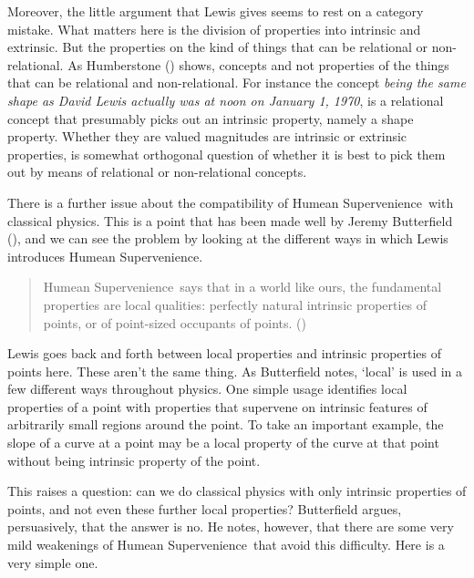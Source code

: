 \documentclass[
  11pt,
  letterpaper,
  DIV=11,
  numbers=noendperiod,
  twoside]{scrartcl}
\begin{document}
Moreover, the little argument that Lewis gives seems to rest on a
category mistake. What matters here is the division of properties into
intrinsic and extrinsic. But the properties on the kind of things that
can be relational or non-relational. As Humberstone
() shows, concepts and not
properties of the things that can be relational and non-relational. For
instance the concept \emph{being the same shape as David Lewis actually
was at noon on January 1, 1970}, is a relational concept that presumably
picks out an intrinsic property, namely a shape property. Whether they
are valued magnitudes are intrinsic or extrinsic properties, is somewhat
orthogonal question of whether it is best to pick them out by means of
relational or non-relational concepts.

There is a further issue about the compatibility of Humean
Supervenience~with classical physics. This is a point that has been made
well by Jeremy Butterfield (), and
we can see the problem by looking at the different ways in which Lewis
introduces Humean Supervenience.

\begin{quote}
Humean Supervenience~says that in a world like ours, the fundamental
properties are local qualities: perfectly natural intrinsic properties
of points, or of point-sized occupants of points.
()
\end{quote}

Lewis goes back and forth between local properties and intrinsic
properties of points here. These aren't the same thing. As Butterfield
notes, `local' is used in a few different ways throughout physics. One
simple usage identifies local properties of a point with properties that
supervene on intrinsic features of arbitrarily small regions around the
point. To take an important example, the slope of a curve at a point may
be a local property of the curve at that point without being intrinsic
property of the point.

This raises a question: can we do classical physics with only intrinsic
properties of points, and not even these further local properties?
Butterfield argues, persuasively, that the answer is no. He notes,
however, that there are some very mild weakenings of Humean
Supervenience~that avoid this difficulty. Here is a very simple one.
\end{document}

